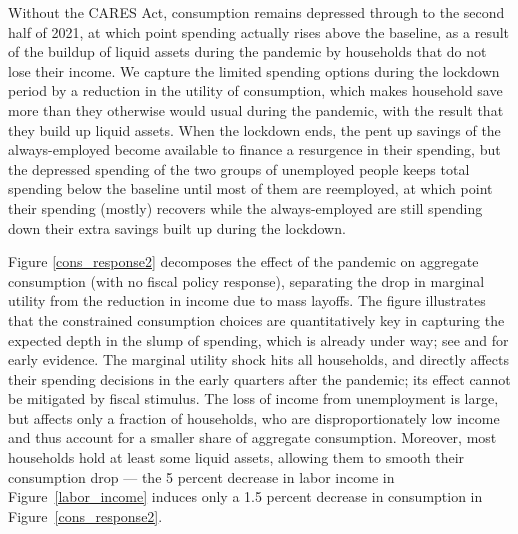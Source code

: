 \documentclass[titlepage,a4paper]{\econtex}
\begin{document}
Without the CARES Act, consumption remains depressed through to the second half of 2021, at which point spending actually rises above the baseline, as a result of the buildup of liquid assets during the pandemic by households that do not lose their income.
We capture the limited spending options during the lockdown period by a reduction in the utility of consumption, which makes household save more than they otherwise would usual during the pandemic, with the result that they build up liquid assets.
When the lockdown ends, the pent up savings of the always-employed become available to finance a resurgence in their spending, but the depressed spending of the two groups of unemployed people keeps total spending below the baseline until most of them are reemployed, at which point their spending (mostly) recovers while the always-employed are still spending down their extra savings built up during the lockdown.

Figure \ref{cons_response2} decomposes the effect of the pandemic on aggregate consumption (with no fiscal policy response), separating the drop in marginal utility from the reduction in income due to mass layoffs.
The figure illustrates that the constrained consumption choices are quantitatively key in capturing the expected depth in the slump of spending, which is already under way; see \cite{baker_Cpandemic} and \cite{nyFedCoronaBlog} for early evidence.
The marginal utility shock hits all households, and directly affects their spending decisions in the early quarters after the pandemic; its effect cannot be mitigated by fiscal stimulus.
The loss of income from unemployment is large, but affects only a fraction of households, who are disproportionately low income and thus account for a smaller share of aggregate consumption.
Moreover, most households hold at least some liquid assets, allowing them to smooth their consumption drop --- the 5 percent  decrease in labor income in Figure~\ref{labor_income} induces only a 1.5 percent  decrease in consumption in Figure~\ref{cons_response2}.
\end{document}
